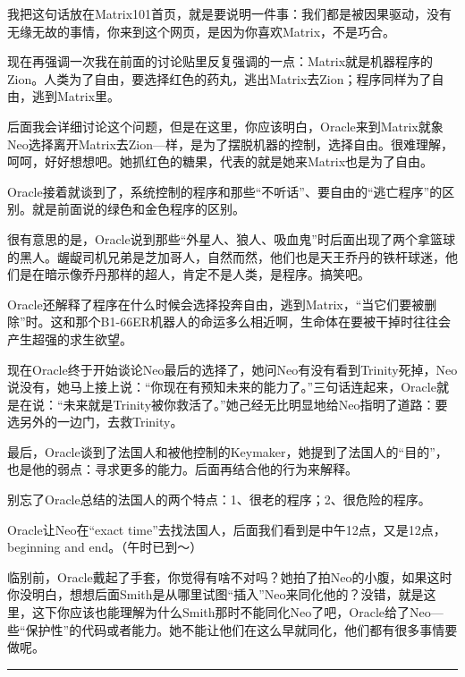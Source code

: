 \documentclass{ctexart}
\newcommand{\myparsep}{\noindent \rule[0.5ex]{\linewidth}{1pt}}
\begin{document}
我把这句话放在Matrix101首页，就是要说明一件事：我们都是被因果驱动，没有无缘无故的事情，你来到这个网页，是因为你喜欢Matrix，不是巧合。

现在再强调一次我在前面的讨论贴里反复强调的一点：Matrix就是机器程序的Zion。人类为了自由，要选择红色的药丸，逃出Matrix去Zion；程序同样为了自由，逃到Matrix里。

后面我会详细讨论这个问题，但是在这里，你应该明白，Oracle来到Matrix就象Neo选择离开Matrix去Zion—样，是为了摆脱机器的控制，选择自由。很难理解，呵呵，好好想想吧。她抓红色的糖果，代表的就是她来Matrix也是为了自由。

Oracle接着就谈到了，系统控制的程序和那些“不听话”、要自由的“逃亡程序”的区别。就是前面说的绿色和金色程序的区别。

很有意思的是，Oracle说到那些“外星人、狼人、吸血鬼”时后面出现了两个拿篮球的黑人。龌龊司机兄弟是芝加哥人，自然而然，他们也是天王乔丹的铁杆球迷，他们是在暗示像乔丹那样的超人，肯定不是人类，是程序。搞笑吧。

Oracle还解释了程序在什么时候会选择投奔自由，逃到Matrix，“当它们要被删除”时。这和那个B1-66ER机器人的命运多么相近啊，生命体在要被干掉时往往会产生超强的求生欲望。

现在Oracle终于开始谈论Neo最后的选择了，她问Neo有没有看到Trinity死掉，Neo说没有，她马上接上说：“你现在有预知未来的能力了。”三句话连起来，Oracle就是在说：“未来就是Trinity被你救活了。”她己经无比明显地给Neo指明了道路：要选另外的一边门，去救Trinity。

最后，Oracle谈到了法国人和被他控制的Keymaker，她提到了法国人的“目的”，也是他的弱点：寻求更多的能力。后面再结合他的行为来解释。

别忘了Oracle总结的法国人的两个特点：1、很老的程序；2、很危险的程序。

Oracle让Neo在“exact time”去找法国人，后面我们看到是中午12点，又是12点，beginning and end。（午时已到～）

临别前，Oracle戴起了手套，你觉得有啥不对吗？她拍了拍Neo的小腹，如果这时你没明白，想想后面Smith是从哪里试图“插入”Neo来同化他的？没错，就是这里，这下你应该也能理解为什么Smith那时不能同化Neo了吧，Oracle给了Neo—些“保护性”的代码或者能力。她不能让他们在这么早就同化，他们都有很多事情要做呢。

\myparsep
\end{document}
